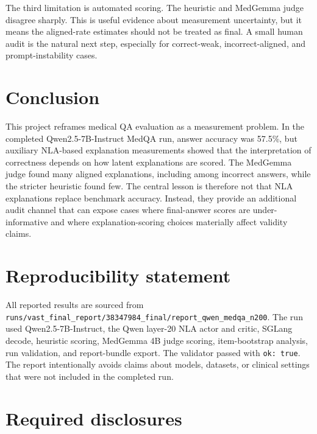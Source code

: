 \documentclass{article}
\newcommand{\runpath}{\texttt{runs/vast\_final\_report/38347984\_final/report\_qwen\_medqa\_n200}}
\begin{document}
The third limitation is automated scoring. The heuristic and MedGemma judge disagree sharply. This is useful evidence about measurement uncertainty, but it means the aligned-rate estimates should not be treated as final. A small human audit is the natural next step, especially for correct-weak, incorrect-aligned, and prompt-instability cases.

\section{Conclusion}

This project reframes medical QA evaluation as a measurement problem. In the completed Qwen2.5-7B-Instruct MedQA run, answer accuracy was 57.5\%, but auxiliary NLA-based explanation measurements showed that the interpretation of correctness depends on how latent explanations are scored. The MedGemma judge found many aligned explanations, including among incorrect answers, while the stricter heuristic found few. The central lesson is therefore not that NLA explanations replace benchmark accuracy. Instead, they provide an additional audit channel that can expose cases where final-answer scores are under-informative and where explanation-scoring choices materially affect validity claims.

\section*{Reproducibility statement}

All reported results are sourced from \runpath. The run used Qwen2.5-7B-Instruct, the Qwen layer-20 NLA actor and critic, SGLang decode, heuristic scoring, MedGemma 4B judge scoring, item-bootstrap analysis, run validation, and report-bundle export. The validator passed with \texttt{ok: true}. The report intentionally avoids claims about models, datasets, or clinical settings that were not included in the completed run.

\section*{Required disclosures}
\end{document}
